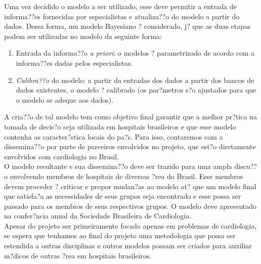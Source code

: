 \documentclass{article}
\begin{document}
Uma vez decidido o modelo a ser utilizado, esse deve permitir a entrada de informa??es fornecidas por especialistas e atualiza??o do modelo a partir do dados. Dessa forma, um modelo Bayesiano ? considerado, j? que as duas etapas podem ser utilizadas no modelo da seguinte forma:
 \begin{enumerate} 
	\item Entrada da informa??o \textit{a priori}: o modelos ? parametrizado de acordo com a informa??es dadas pelos especialistas.
	\item \textit{Calibra??o} do modelo: a partir da entradas dos dados a partir dos bancos de dados existentes, o modelo ? calibrado (os par?metros s?o ajustados para que o modelo se adeque aos dados).
 \end{enumerate}
A cria??o de tal modelo tem como objetivo final garantir que a melhor pr?tica na tomada de decis?o seja utilizada em hospitais brasileiros e que esse modelo contenha as caracter?stica locais do pa?s. Para isso, contaremos com a dissemina??o por parte de parceiros envolvidos no projeto, que est?o diretamente envolvidos com cardiologia no Brasil.\\
O modelo resultante e sua dissemina??o deve ser trazido para 
uma ampla discu??o envolvendo membros de hospitais de diversas ?rea do Brasil. Esse membros devem proceder ? criticar e propor mudan?as ao modelo at? que um modelo final que satisfa?a as necessidades de seus grupos seja encontrado e esse possa ser passado para os membros de seus respectivos grupos. O modelo deve apresentado na confer?ncia anual da Sociedade Brasileira de Cardiologia.\\


Apesar do projeto ser primeiramente focado apenas em problemas de cardiologia, se espera que tenhamos ao final do projeto uma metodologia que possa ser estendida a outras disciplinas e outros modelos possam ser criados para auxiliar m?dicos de outras ?rea em hospitais brasileiros.
\end{document}
